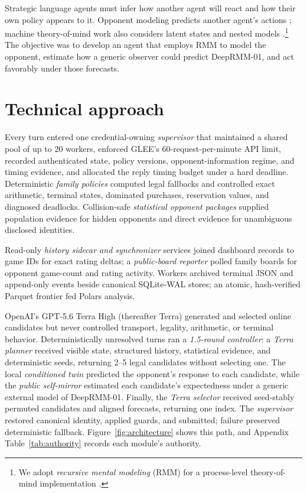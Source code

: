 \documentclass{article}
\newcommand{\DeepRMM}{DeepRMM-01}
\begin{document}
Strategic language agents must infer how another agent will react and how their own policy appears to it. Opponent modeling predicts another agent's actions \citep{albrecht2018}; machine theory-of-mind work also considers latent states and nested models \citep{rabinowitz2018}.\footnote{We adopt \emph{recursive mental modeling} (RMM) for a process-level theory-of-mind implementation \citep{tochilov2026nommd}.} The objective was to develop an agent that employs RMM to model the opponent, estimate how a generic observer could predict \DeepRMM{}, and act favorably under those forecasts.

\section{Technical approach}

Every turn entered one credential-owning \emph{supervisor} that maintained a shared pool of up to 20 workers, enforced GLEE's 60-request-per-minute API limit, recorded authenticated state, policy versions, opponent-information regime, and timing evidence, and allocated the reply timing budget under a hard deadline. Deterministic \emph{family policies} computed legal fallbacks and controlled exact arithmetic, terminal states, dominated purchases, reservation values, and diagnosed deadlocks. Collision-safe \emph{statistical opponent packages} supplied population evidence for hidden opponents and direct evidence for unambiguous disclosed identities.

Read-only \emph{history sidecar and synchronizer} services joined dashboard records to game IDs for exact rating deltas; a \emph{public-board reporter} polled family boards for opponent game-count and rating activity. Workers archived terminal JSON and append-only events beside canonical SQLite-WAL stores; an atomic, hash-verified Parquet frontier fed Polars analysis.

OpenAI's GPT-5.6 Terra High (thereafter Terra) generated and selected online candidates but never controlled transport, legality, arithmetic, or terminal behavior. Deterministically unresolved turns ran a \emph{1.5-round controller}: a \emph{Terra planner} received visible state, structured history, statistical evidence, and deterministic seeds, returning 2--5 legal candidates without selecting one. The local \emph{conditioned twin} predicted the opponent's response to each candidate, while the \emph{public self-mirror} estimated each candidate's expectedness under a generic external model of \DeepRMM{}. Finally, the \emph{Terra selector} received seed-stably permuted candidates and aligned forecasts, returning one index. The \emph{supervisor} restored canonical identity, applied guards, and submitted; failure preserved deterministic fallback. Figure~\ref{fig:architecture} shows this path, and Appendix Table~\ref{tab:authority} records each module's authority.
\end{document}
